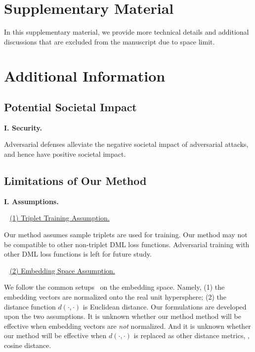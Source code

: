 
\clearpage
\appendix

\setcounter{figure}{8}
\setcounter{table}{6}

\section*{Supplementary Material}

In this supplementary material, we provide more technical details and
additional discussions that are excluded from the manuscript due to space
limit.

\tableofcontents

\section{Additional Information}
\label{sec:a}

\subsection{Potential Societal Impact}
\label{sec:a1}

\noindent\textbf{I. Security.}

Adversarial defenses alleviate the negative societal impact of adversarial
attacks, and hence have positive societal impact.

\subsection{Limitations of Our Method}
\label{sec:a2}

\noindent\textbf{I. Assumptions.}

~\newline
\noindent \ul{(1) Triplet Training Assumption.}

Our method assumes sample triplets are used for training.
%
Our method may not be compatible to other non-triplet DML loss functions.
%
Adversarial training with other DML loss functions is left for future study.

~\newline
\noindent \ul{(2) Embedding Space Assumption.}

We follow the common setups~\cite{revisiting,robrank} on the embedding space.
%
Namely, (1) the embedding vectors are normalized onto the real unit
hypersphere;
%
(2) the distance function $d(\cdot,\cdot)$ is Euclidean distance.
%
Our formulations are developed upon the two assumptions.
%
It is unknown whether our method method will be effective when embedding
vectors are \emph{not} normalized.
%
And it is unknown whether our method will be effective when $d(\cdot,\cdot)$ is
replaced as other distance metrics, \eg, cosine distance.

